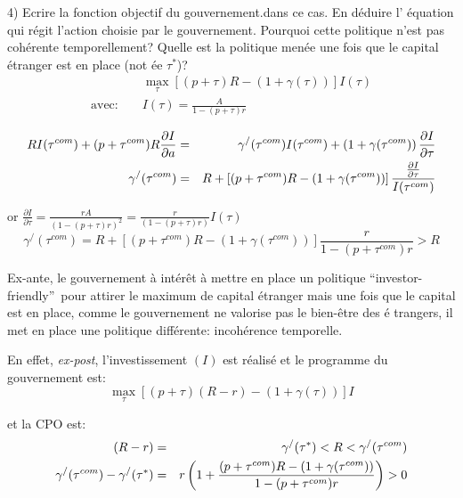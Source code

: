 \documentclass[a4paper]{article}
\begin{document}
\bigskip

4) Ecrire la fonction objectif du gouvernement.dans ce cas. En d\'{e}duire l'%
\'{e}quation qui r\'{e}git l'action choisie par le gouvernement. Pourquoi
cette politique n'est pas coh\'{e}rente temporellement? Quelle est la
politique men\'{e}e une fois que le capital \'{e}tranger est en place (not%
\'{e}e $\tau ^{\ast }$)?%
\begin{eqnarray*}
&&\max_{\tau }\left[ (p+\tau )R-(1+\gamma (\tau ))\right] I(\tau ) \\
\text{avec}\text{: } &&I(\tau )=\frac{A}{1-(p+\tau )r}
\end{eqnarray*}

\begin{eqnarray*}
RI(\tau ^{com})+(p+\tau ^{com})R\frac{\partial I}{\partial a} &=&\gamma
^{/}(\tau ^{com})I(\tau ^{com})+\left( 1+\gamma (\tau ^{com})\right) \frac{%
\partial I}{\partial \tau } \\
\gamma ^{/}(\tau ^{com}) &=&R+\left[ (p+\tau ^{com})R-(1+\gamma (\tau
^{com}))\right] \frac{\frac{\partial I}{\partial \tau }}{I(\tau ^{com})}
\end{eqnarray*}

or $\frac{\partial I}{\partial \tau }=\frac{rA}{\left( 1-(p+\tau )r\right)
^{2}}=\frac{r}{\left( 1-(p+\tau )r\right) }I(\tau )$%
\begin{equation*}
\gamma ^{/}(\tau ^{com})=R+\left[ (p+\tau ^{com})R-\left( 1+\gamma (\tau
^{com})\right) \right] \frac{r}{1-(p+\tau ^{com})r}>R
\end{equation*}

Ex-ante, le gouvernement \`{a} int\'{e}r\^{e}t \`{a} mettre en place un
politique \textquotedblleft investor-friendly\textquotedblright\ pour
attirer le maximum de capital \'{e}tranger mais une fois que le capital est
en place, comme le gouvernement ne valorise pas le bien-\^{e}tre des \'{e}%
trangers, il met en place une politique diff\'{e}rente: incoh\'{e}rence
temporelle.

En effet, \textit{ex-post}, l'investissement $(I)$ est r\'{e}alis\'{e} et le
programme du gouvernement est:%
\begin{equation*}
\max_{\tau }\left[ (p+\tau )\left( R-r\right) -\left( 1+\gamma (\tau
)\right) \right] I
\end{equation*}

et la CPO est:%
\begin{eqnarray*}
\left( R-r\right)  &=&\gamma ^{/}(\tau ^{\ast })<R<\gamma ^{/}(\tau ^{com})
\\
\gamma ^{/}(\tau ^{com})-\gamma ^{/}(\tau ^{\ast }) &=&r\left( 1+\frac{%
(p+\tau ^{com})R-\left( 1+\gamma (\tau ^{com})\right) }{1-(p+\tau ^{com})r}%
\right) >0
\end{eqnarray*}
\end{document}
